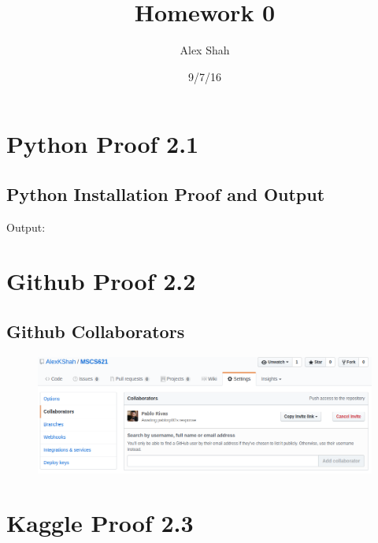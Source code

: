 \documentclass[a4paper]{article}
\title{Homework 0}
\author{Alex Shah}
\date{9/7/16}
\begin{document}
\lstset{language=Python}

\maketitle

\section{Python Proof 2.1}
\subsection{Python Installation Proof and Output}

Output:


\clearpage

\section{Github Proof 2.2}
\subsection{Github Collaborators}
\begin{figure}[H]
  \includegraphics[width=\textwidth]{2-2-gitProof.png}  
\end{figure}

\clearpage

\section{Kaggle Proof 2.3}
\end{document}
